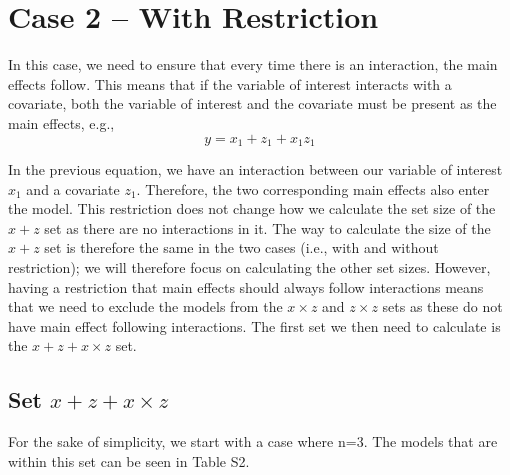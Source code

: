 \section{Case 2 – With Restriction}

In this case, we need to ensure that every time there is an interaction, the main effects follow. This means that if the variable of interest interacts with a covariate, both the variable of interest and the covariate must be present as the main effects, e.g.,
\[y=x_1+z_1+x_1z_1\] 

In the previous equation, we have an interaction between our variable of interest $x_1$ and a covariate $z_1$. Therefore, the two corresponding main effects also enter the model. This restriction does not change how we calculate the set size of the $x + z$ set as there are no interactions in it. The way to calculate the size of the $x + z$ set is therefore the same in the two cases (i.e., with and without restriction); we will therefore focus on calculating the other set sizes. However, having a restriction that main effects should always follow interactions means that we need to exclude the models from the $x \times z$ and $z \times z$ sets as these do not have main effect following interactions. The first set we then need to calculate is the $x + z + x \times z$ set.

\subsection{Set $x + z + x \times z$}
For the sake of simplicity, we start with a case where n=3. The models that are within this set can be seen in Table S2. \\

